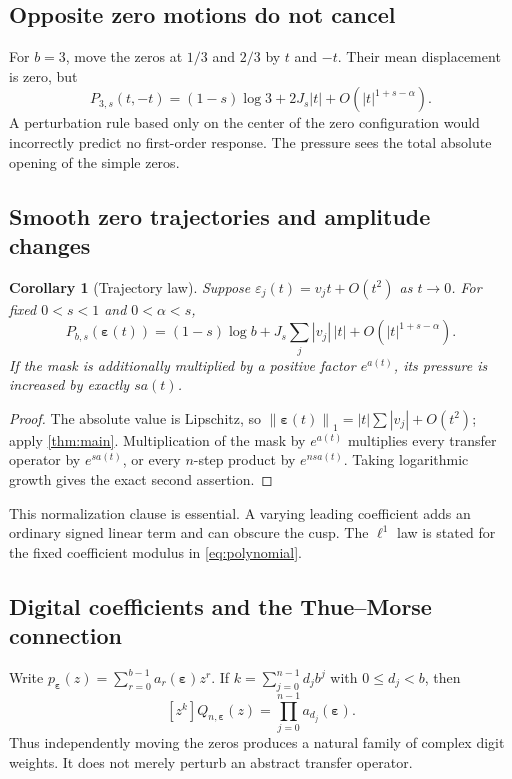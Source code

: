 \documentclass[11pt,a4paper]{article}
\numberwithin{equation}{section}
\newtheorem{corollary}[corollary]{Corollary}
\theoremstyle{definition}
\theoremstyle{remark}
\newcommand{\norm}[1]{\left\lVert#1\right\rVert}
\newcommand{\eps}{\boldsymbol\varepsilon}
\begin{document}
\subsection{Opposite zero motions do not cancel}
For $b=3$, move the zeros at $1/3$ and $2/3$ by $t$ and $-t$.
Their mean displacement is zero, but
\begin{equation}
 P_{3,s}(t,-t)=(1-s)\log3+2J_s|t|
                         +O(|t|^{1+s-\alpha}).
 \label{eq:opposite}
\end{equation}
A perturbation rule based only on the center of the zero configuration
would incorrectly predict no first-order response. The pressure sees
the total absolute opening of the simple zeros.

\subsection{Smooth zero trajectories and amplitude changes}
\begin{corollary}[Trajectory law]
\label{cor:trajectory}
Suppose $\varepsilon_j(t)=v_jt+O(t^2)$ as $t\to0$. For fixed
$0<s<1$ and $0<\alpha<s$,
\begin{equation}
 P_{b,s}(\eps(t))=(1-s)\log b+J_s\sum_j|v_j|\,|t|
                              +O(|t|^{1+s-\alpha}).
 \label{eq:trajectory}
\end{equation}
If the mask is additionally multiplied by a positive factor $e^{a(t)}$,
its pressure is increased by exactly $sa(t)$.
\end{corollary}
\begin{proof}
The absolute value is Lipschitz, so
$\norm{\eps(t)}_1=|t|\sum|v_j|+O(t^2)$; apply \cref{thm:main}.
Multiplication of the mask by $e^{a(t)}$ multiplies every transfer
operator by $e^{sa(t)}$, or every $n$-step product by $e^{nsa(t)}$.
Taking logarithmic growth gives the exact second assertion.
\end{proof}
This normalization clause is essential. A varying leading coefficient
adds an ordinary signed linear term and can obscure the cusp. The
$\ell^1$ law is stated for the fixed coefficient modulus in
\cref{eq:polynomial}.

\subsection{Digital coefficients and the Thue--Morse connection}
Write $p_{\eps}(z)=\sum_{r=0}^{b-1}a_r(\eps)z^r$. If
$k=\sum_{j=0}^{n-1}d_jb^j$ with $0\leq d_j<b$, then
\[
 [z^k]Q_{n,\eps}(z)=\prod_{j=0}^{n-1}a_{d_j}(\eps).
\]
Thus independently moving the zeros produces a natural family of
complex digit weights. It does not merely perturb an abstract
transfer operator.
\end{document}
